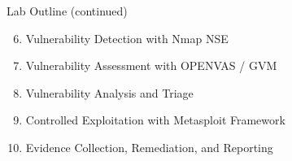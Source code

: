 \begin{frame}{Lab Outline (continued)}
  \begin{enumerate}
    \setcounter{enumi}{5}
    \item Vulnerability Detection with Nmap NSE
    \item Vulnerability Assessment with OPENVAS / GVM
    \item Vulnerability Analysis and Triage
    \item Controlled Exploitation with Metasploit Framework
    \item Evidence Collection, Remediation, and Reporting
  \end{enumerate}
\end{frame}
